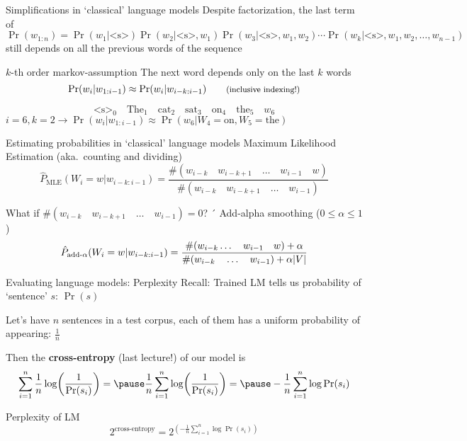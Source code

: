 \documentclass[12pt,aspectratio=169,handout]{beamer}
\begin{document}
\begin{frame}{Simplifications in `classical' language models}
	Despite factorization, the last term of
	$
	\Pr(w_{1:n}) = \Pr(w_1 | \text{<s>}) \Pr (w_2 | \text{<s>}, w_1) \Pr(w_3 | \text{<s>}, w_1, w_2) \cdots \Pr(w_k | \text{<s>}, w_1, w_2, \ldots, w_{n-1})
	$
	still depends on all the previous words of the sequence
	
	\begin{block}{$k$-th order markov-assumption}
		The next word depends only on the last $k$ words
		$$
		\Pr(w_{i} | w_{1:i-1}) \approx \Pr (w_{i} | w_{i-k:i-1}) \qquad \text{\footnotesize{(inclusive indexing!)}}
		$$
	\end{block}
	\pause
	$$
	\text{<s>}_0 \quad \text{The}_1 \quad \text{cat}_2 \quad \text{sat}_3 \quad \text{on}_4 \quad \text{the}_5 \quad w_6
	$$
	$i = 6, k=2 \to \Pr(w_{i} | w_{1:i-1}) \approx \Pr(w_6 | W_4 = \text{on}, W_5 = \text{the})$
\end{frame}

\begin{frame}{Estimating probabilities in `classical' language models}
	Maximum Likelihood Estimation (aka.\ counting and dividing)
	$$
	\hat{P}_{\text{MLE}}(W_i = w | w_{i - k:i - 1}) = \frac{\#(w_{i-k} \quad w_{i-k+1} \quad \ldots \quad w_{i-1} \quad w)}{\#(w_{i-k} \quad w_{i-k+1} \quad \ldots \quad w_{i-1})}
	$$
	\begin{block}{What if $\#(w_{i-k} \quad w_{i-k+1} \quad \ldots \quad w_{i-1}) = 0$?}
		\pause´
		Add-alpha smoothing ($0 \leq \alpha \leq 1$)
		$$
		\hat{P}_{\text{add-}\alpha}(W_i = w | w_{i - k:i - 1}) =
		\frac{\#(w_{i-k} \ldots \quad w_{i-1} \quad w) + \alpha}
		{\#(w_{i-k} \quad \ldots \quad w_{i-1}) + \alpha \abs{V}}
		$$
	\end{block}
	
\end{frame}


\begin{frame}{Evaluating language models: Perplexity}
	Recall: Trained LM tells us probability of `sentence' $s$: $\Pr(s)$
	
	\pause
	Let's have $n$ sentences in a test corpus, each of them has a uniform probability of appearing: $\frac{1}{n}$
	
	\pause
	Then the \textbf{cross-entropy} (last lecture!) of our model is
	$$
	\sum_{i = 1}^{n} \frac{1}{n} \log (\frac{1}{\Pr(s_i)}) = \pause
	\frac{1}{n} \sum_{i = 1}^{n} \log (\frac{1}{\Pr(s_i)}) = \pause
	- \frac{1}{n} \sum_{i = 1}^{n} \log \Pr(s_i)
	$$
	\pause \begin{block}{Perplexity of LM}
		$$
		2^{\text{cross-entropy}} = 
		2^{\left(- \frac{1}{n} \sum_{i = 1}^{n} \log \Pr(s_i)\right)}
		$$
	\end{block}
	
\end{frame}
\end{document}
